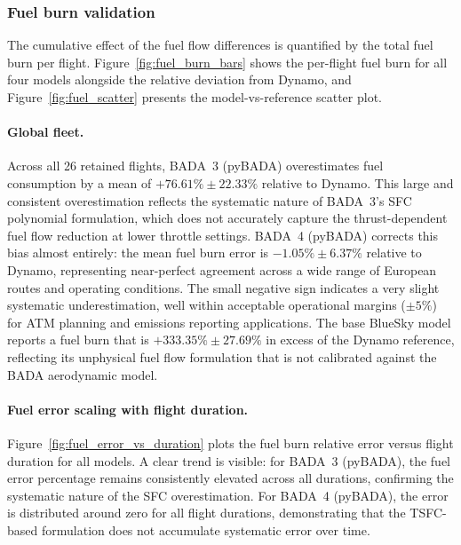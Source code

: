 \subsubsection{Fuel burn validation}

The cumulative effect of the fuel flow differences is quantified by the total fuel burn per flight. Figure~\ref{fig:fuel_burn_bars} shows the per-flight fuel burn for all four models alongside the relative deviation from Dynamo, and Figure~\ref{fig:fuel_scatter} presents the model-vs-reference scatter plot.

\paragraph{Global fleet.}

Across all 26 retained flights, BADA~3 (pyBADA) overestimates fuel consumption by a mean of $+76.61\% \pm 22.33\%$ relative to Dynamo. This large and consistent overestimation reflects the systematic nature of BADA~3's SFC polynomial formulation, which does not accurately capture the thrust-dependent fuel flow reduction at lower throttle settings. BADA~4 (pyBADA) corrects this bias almost entirely: the mean fuel burn error is $-1.05\% \pm 6.37\%$ relative to Dynamo, representing near-perfect agreement across a wide range of European routes and operating conditions. The small negative sign indicates a very slight systematic underestimation, well within acceptable operational margins ($\pm 5\%$) for ATM planning and emissions reporting applications. The base BlueSky model reports a fuel burn that is $+333.35\% \pm 27.69\%$ in excess of the Dynamo reference, reflecting its unphysical fuel flow formulation that is not calibrated against the BADA aerodynamic model.

\paragraph{Fuel error scaling with flight duration.}
Figure~\ref{fig:fuel_error_vs_duration} plots the fuel burn relative error versus flight duration for all models. A clear trend is visible: for BADA~3 (pyBADA), the fuel error percentage remains consistently elevated across all durations, confirming the systematic nature of the SFC overestimation. For BADA~4 (pyBADA), the error is distributed around zero for all flight durations, demonstrating that the TSFC-based formulation does not accumulate systematic error over time.

